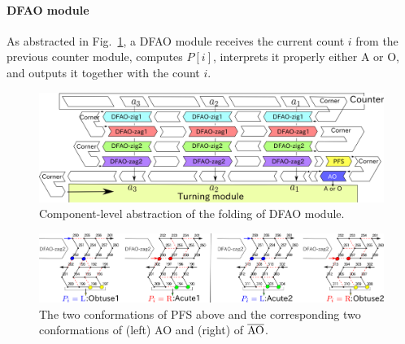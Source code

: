 			\paragraph{DFAO module}
%
As abstracted in Fig.~\ref{fig:abst_dfao}, a DFAO module receives the current count $i$ from the previous counter module, computes $P[i]$, interprets it properly either A or O, and outputs it together with the count $i$. 

\begin{figure}[tp]
\centering
\includegraphics[width=0.8\linewidth]{pic/abst_DFAO.png}
\caption{Component-level abstraction of the folding of DFAO module.}
\label{fig:abst_dfao}
\end{figure}


\begin{figure}[h]
\includegraphics[width=\linewidth]{pic/PFS.png}
\caption{The two conformations of PFS above and the corresponding two conformations of (left) AO and (right) of $\overline{\rm AO}$.}
\label{fig:PFS}
\end{figure}

